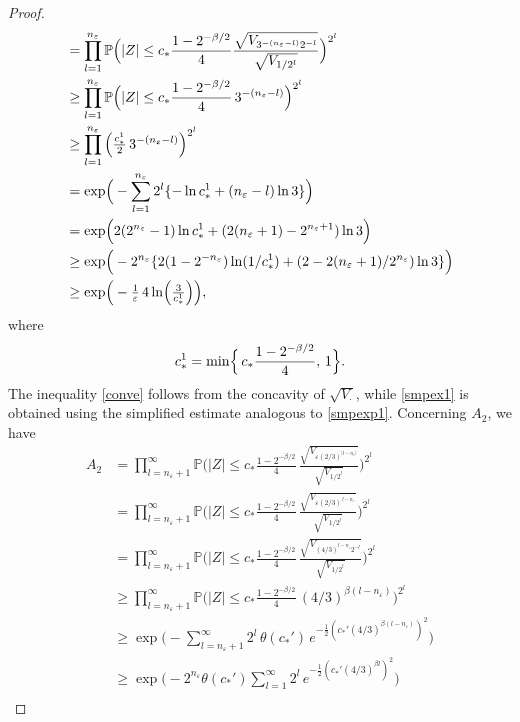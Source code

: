 \documentclass[preprint,12pt]{elsarticle}
\theoremstyle{definition}  %
\theoremstyle{plain}  %
\begin{document}
\begin{proof}
\begin{align}
&= \prod_{l=1}^{n_\varepsilon} \mathbb{P}\Big(|Z|\leq c_* \frac{1-2^{-\beta/2}}{4} \frac{\sqrt{V_{3^{-(n_\varepsilon-l)}2^{-l}}}}{\sqrt{V_{1/2^l}}}\Big)^{2^l} \notag\\ 
&\geq \prod_{l=1}^{n_\varepsilon} \mathbb{P}\Big(|Z|\leq c_* \frac{1-2^{-\beta/2}}{4}\,3^{-(n_\varepsilon-l)}\Big)^{2^l} \label{conve}\\ 
&\geq \prod_{l=1}^{n_\varepsilon} \left(\tfrac{c_*^1}{2}\,3^{-(n_\varepsilon-l)}\right)^{2^l} \label{smpex1}\\ 
&= \exp\!\Big(-\sum_{l=1}^{n_\varepsilon} 2^l \{-\ln c_*^1+(n_\varepsilon-l)\ln3 \}\Big) \notag\\ 
&= \exp\!\Big(2(2^{n_\varepsilon}-1)\ln c_*^1 + (2(n_{\varepsilon}+1)-2^{n_{\varepsilon}+1})\ln3 \Big) \notag\\ 
&\geq \exp\!\Big(-2^{n_\varepsilon} \{2(1-2^{-n_\varepsilon})\ln(1/c_*^1) +(2-2(n_{\varepsilon}+1)/2^{n_\varepsilon})\ln3 \}\Big) \notag\\ 
&\geq \exp\!\Big(-\tfrac{1}{\varepsilon}\,4\ln\!\Big(\tfrac{3}{c_*^1}\Big) \Big), \notag 
\end{align} 
where 
\[ c_*^1 = \min\Bigl\{\,c_* \frac{1-2^{-\beta/2}}{4},\,1\Bigr\}. \] 
The inequality \eqref{conve} follows from the concavity of $\sqrt{V_\cdot}$, while \eqref{smpex1} is obtained using the simplified estimate analogous to \eqref{smpexp1}. 
Concerning $A_2$, we have 
\begin{align*} 
A_2 &= \prod_{l=n_\varepsilon+1}^\infty \mathbb{P}\!\Big(|Z|\leq c_* \frac{1-2^{-\beta/2}}{4}\, \frac{\sqrt{V_{\varepsilon(2/3)^{|l-n_\varepsilon|}}}}{\sqrt{V_{1/2^l}}}\Big)^{2^l}\\ 
&= \prod_{l=n_\varepsilon+1}^\infty \mathbb{P}\!\Big(|Z|\leq c_* \frac{1-2^{-\beta/2}}{4}\, \frac{\sqrt{V_{\varepsilon(2/3)^{\,l-n_\varepsilon}}}}{\sqrt{V_{1/2^l}}}\Big)^{2^l}\\ 
&= \prod_{l=n_\varepsilon+1}^\infty \mathbb{P}\!\Big(|Z|\leq c_* \frac{1-2^{-\beta/2}}{4}\, \frac{\sqrt{V_{(4/3)^{l-n_\varepsilon}2^{-l}}}}{\sqrt{V_{1/2^l}}}\Big)^{2^l}\\ 
&\geq \prod_{l=n_\varepsilon+1}^\infty \mathbb{P}\!\Big(|Z|\leq c_* \frac{1-2^{-\beta/2}}{4}\,(4/3)^{\beta(l-n_\varepsilon)} \Big)^{2^l}\\ 
&\geq \exp\!\Big( -\sum_{l=n_\varepsilon+1}^\infty 2^l\, \theta(c_*')\, e^{-\tfrac{1}{2}(c_*'(4/3)^{\beta(l-n_\varepsilon)})^2} \Big) \\ 
&\geq \exp\!\Big( -2^{n_\varepsilon}\theta(c_*') \sum_{l=1}^\infty 2^l\, e^{-\tfrac{1}{2}(c_*'(4/3)^{\beta l})^2} \Big) \\ 

\end{align*}
\end{proof}
\end{document}
